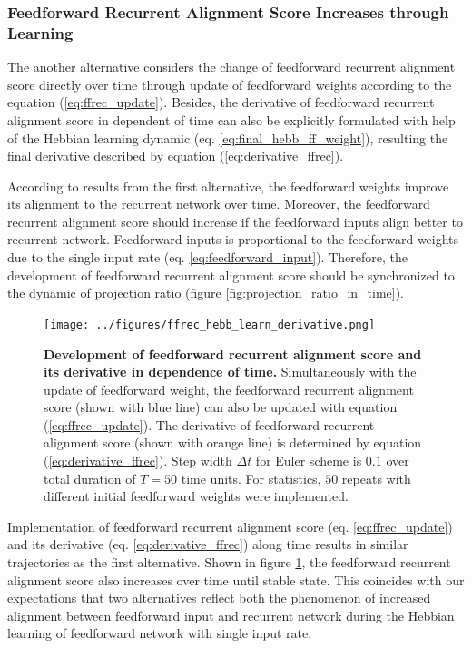 \documentclass[11pt]{article}
\begin{document}
	\subsubsection{Feedforward Recurrent Alignment Score Increases through Learning}
	
	The another alternative considers the change of feedforward recurrent alignment score directly over time through update of feedforward weights according to the equation (\ref{eq:ffrec_update}). Besides, the derivative of feedforward recurrent alignment score in dependent of time can also be explicitly formulated with help of the Hebbian learning dynamic (eq. \ref{eq:final_hebb_ff_weight}), resulting the final derivative described by equation (\ref{eq:derivative_ffrec}). 
	
	According to results from the first alternative, the feedforward weights improve its alignment to the recurrent network over time. Moreover, the feedforward recurrent alignment score should increase if the feedforward inputs align better to recurrent network. Feedforward inputs is proportional to the feedforward weights due to the single input rate (eq. \ref{eq:feedforward_input}). Therefore, the development of feedforward recurrent alignment score should be synchronized to the dynamic of projection ratio (figure \ref{fig:projection_ratio_in_time}). 
	
		\begin{figure}
			\centering
			\texttt{[image: ../figures/ffrec\_hebb\_learn\_derivative.png]}
			\caption{\textbf{Development of feedforward recurrent alignment score and its derivative in dependence of time.} Simultaneously with the update of feedforward weight, the feedforward recurrent alignment score (shown with blue line) can also be updated with equation (\ref{eq:ffrec_update}). The derivative of feedforward recurrent alignment score (shown with orange line) is determined by equation (\ref{eq:derivative_ffrec}). Step width $\Delta t$ for Euler scheme is $0.1$ over total duration of $T=50$ time units. For statistics, $50$ repeats with different initial feedforward weights were implemented.}
			\label{fig:ffrec_Hebb_learn}
		\end{figure}
	
	Implementation of feedforward recurrent alignment score (eq. \ref{eq:ffrec_update}) and its derivative (eq. \ref{eq:derivative_ffrec}) along time results in similar trajectories as the first alternative. Shown in figure \ref{fig:ffrec_Hebb_learn}, the feedforward recurrent alignment score also increases over time until stable state. This coincides with our expectations that two alternatives reflect both the phenomenon of increased alignment between feedforward input and recurrent network during the Hebbian learning of feedforward network with single input rate. 

	
\end{document}
